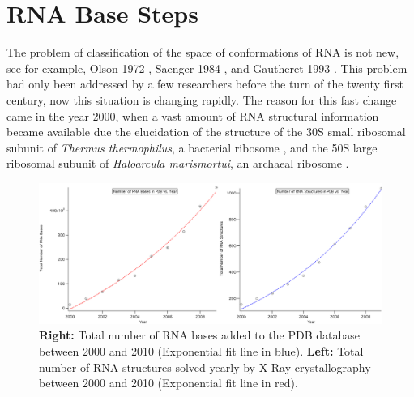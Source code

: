 \chapter{RNA Base Steps}
\label{basesteps} 

The problem of classification of the space of conformations
of RNA  is not  new, see for  example, Olson  1972 \cite{olson1_1972},
Saenger     1984     \cite{saenger1984},     and    Gautheret     1993
\cite{gautheret1993}.  This  problem had only been addressed  by a few
researchers  before the  turn of  the twenty  first century,  now this
situation is changing rapidly. The reason for this fast change came in
the year 2000, when a vast amount of RNA structural information became
available  due the  elucidation  of  the structure  of  the 30S  small
ribosomal  subunit  of   \textit{Thermus  thermophilus},  a  bacterial
ribosome  \cite{wimberly2000,  schluenzen2000},   and  the  50S  large
ribosomal subunit of \textit{Haloarcula marismortui}, an archaeal
ribosome \cite{ban2000}.
\begin{figure}[H]
\centering
\includegraphics[scale=0.38]{Chapter2/rna2000_2009copy.png}
\caption{\textbf{Right:} Total  number of RNA  bases added to  the PDB
database  between 2000 and  2010 (Exponential fit line in
blue). \textbf{Left:}  Total number  of RNA structures  solved yearly
by X-Ray  crystallography between  2000 and 2010 (Exponential fit line
in red).}
\label{fig:rnainpdb}
\end{figure}


